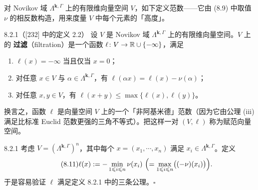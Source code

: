 对 Novikov 域 $\Lambda^{\mathbf{k},\Gamma}$ 上的有限维向量空间 $V$，如下定义范数——它由 (8.9)
中取值 $\nu$ 的相反数构造，用来度量 $V$ 中每个元素的「高度」。

\begin{wdefn}{8.2.1}（[232] 中的定义 2.2）
  设 $V$ 是 Novikov 域 $\Lambda^{\mathbf{k},\Gamma}$ 上的有限维向量空间。$V$ 上的
  \textbf{过滤}（filtration）是一个函数 $\ell\colon V\to\mathbb{R}\cup\{-\infty\}$，满足
  \begin{enumerate}[label=(\roman*)]
    \item $\ell(x)=-\infty$ 当且仅当 $x=0$；
    \item 对任意 $x\in V$ 与 $\alpha\in\Lambda^{\mathbf{k},\Gamma}$，有
          $\ell(\alpha x)=\ell(x)-\nu(\alpha)$；
    \item 对任意 $x,y\in V$，有 $\ell(x+y)\leqslant\max\{\ell(x),\ell(y)\}$。
  \end{enumerate}
\end{wdefn}

换言之，函数 $\ell$ 是向量空间 $V$ 上的一个「非阿基米德」范数（因为它由公理 (iii) 满足比标准
Euclid 范数更强的三角不等式）。把这样一对 $(V,\ell)$ 称为赋范向量空间。

\begin{wexam}{8.2.1}
  考虑 $V=(\Lambda^{\mathbf{k},\Gamma})^n$，其中每个 $x=(x_1,\cdots,x_n)$ 满足
  $x_i\in\Lambda^{\mathbf{k},\Gamma}$。定义
  \begin{equation}\tag{8.11}
    \ell(x):=-\min_{1\leqslant i\leqslant n}\nu(x_i)
      \ \Bigl(=\max_{1\leqslant i\leqslant n}\bigl((-\nu)(x_i)\bigr)\Bigr).
  \end{equation}
  于是容易验证 $\ell$ 满足定义 8.2.1 中的三条公理。\hfill$\square$
\end{wexam}

